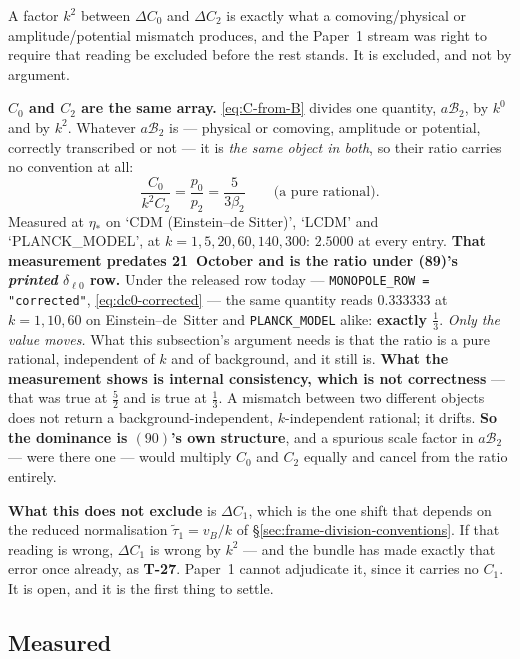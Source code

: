 A factor $k^2$ between $\Delta C_0$ and $\Delta C_2$ is exactly what a
comoving/physical or amplitude/potential mismatch produces, and the Paper~1
stream was right to require that reading be excluded before the rest stands.
It is excluded, and not by argument.

\textbf{$C_0$ and $C_2$ are the same array.} \eqref{eq:C-from-B} divides one
quantity, $a\mathcal B_2$, by $k^0$ and by $k^2$. Whatever $a\mathcal B_2$ is
--- physical or comoving, amplitude or potential, correctly transcribed or not
--- it is \emph{the same object in both}, so their ratio carries no convention
at all:
\begin{equation}
  \frac{C_0}{k^2C_2}=\frac{p_0}{p_2}=\frac{5}{3\beta_2}
  \qquad\text{(a pure rational).}
\end{equation}
Measured at $\eta_*$ on `CDM (Einstein--de Sitter)', `LCDM' and
`PLANCK\_MODEL', at $k=1,5,20,60,140,300$: $\mathbf{2.5000}$ at every entry.
\textbf{That measurement predates 21~October and is the ratio under (89)'s
\emph{printed} $\delta_{\ell0}$ row.} Under the released row today ---
\texttt{MONOPOLE\_ROW = "corrected"}, \eqref{eq:dc0-corrected} --- the same
quantity reads $0.333333$ at $k=1,10,60$ on Einstein--de~Sitter and
\texttt{PLANCK\_MODEL} alike: \textbf{exactly $\tfrac13$}. \emph{Only the
value moves.} What this subsection's argument needs is that the ratio is a
pure rational, independent of $k$ and of background, and it still is.
\textbf{What the measurement shows is internal consistency, which is not
correctness} --- that was true at $\tfrac52$ and is true at $\tfrac13$.
A mismatch between two different objects does not return a
background-independent, $k$-independent rational; it drifts. \textbf{So the
dominance is $(90)$'s own structure}, and a spurious scale factor in
$a\mathcal B_2$ --- were there one --- would multiply $C_0$ and $C_2$ equally
and cancel from the ratio entirely.

\textbf{What this does not exclude} is $\Delta C_1$, which is the one shift
that depends on the reduced normalisation $\tilde\tau_1=v_B/k$ of
\S\ref{sec:frame-division-conventions}. If that reading is wrong, $\Delta C_1$
is wrong by $k^2$ --- and the bundle has made exactly that error once already,
as \textbf{T-27}. Paper~1 cannot adjudicate it, since it carries no $C_1$. It is
open, and it is the first thing to settle.

\subsection{Measured}

